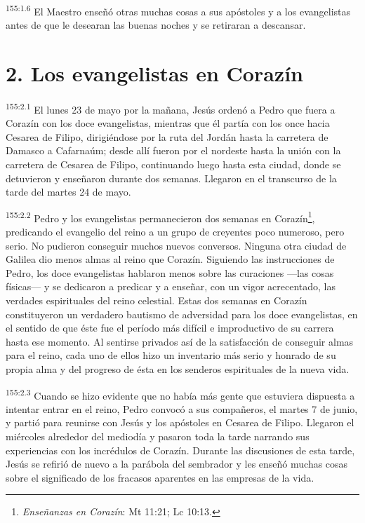 \par
\textsuperscript{155:1.6} El Maestro enseñó otras muchas cosas a sus apóstoles y a los evangelistas antes de que le desearan las buenas noches y se retiraran a descansar.

\section*{2. Los evangelistas en Corazín}
\par
\textsuperscript{155:2.1} El lunes 23 de mayo por la mañana, Jesús ordenó a Pedro que fuera a Corazín con los doce evangelistas, mientras que él partía con los once hacia Cesarea de Filipo, dirigiéndose por la ruta del Jordán hasta la carretera de Damasco a Cafarnaúm; desde allí fueron por el nordeste hasta la unión con la carretera de Cesarea de Filipo, continuando luego hasta esta ciudad, donde se detuvieron y enseñaron durante dos semanas. Llegaron en el transcurso de la tarde del martes 24 de mayo.

\par
\textsuperscript{155:2.2} Pedro y los evangelistas permanecieron dos semanas en Corazín\footnote{\textit{Enseñanzas en Corazín}: Mt 11:21; Lc 10:13.}, predicando el evangelio del reino a un grupo de creyentes poco numeroso, pero serio. No pudieron conseguir muchos nuevos conversos. Ninguna otra ciudad de Galilea dio menos almas al reino que Corazín. Siguiendo las instrucciones de Pedro, los doce evangelistas hablaron menos sobre las curaciones ---las cosas físicas--- y se dedicaron a predicar y a enseñar, con un vigor acrecentado, las verdades espirituales del reino celestial. Estas dos semanas en Corazín constituyeron un verdadero bautismo de adversidad para los doce evangelistas, en el sentido de que éste fue el período más difícil e improductivo de su carrera hasta ese momento. Al sentirse privados así de la satisfacción de conseguir almas para el reino, cada uno de ellos hizo un inventario más serio y honrado de su propia alma y del progreso de ésta en los senderos espirituales de la nueva vida.

\par
\textsuperscript{155:2.3} Cuando se hizo evidente que no había más gente que estuviera dispuesta a intentar entrar en el reino, Pedro convocó a sus compañeros, el martes 7 de junio, y partió para reunirse con Jesús y los apóstoles en Cesarea de Filipo. Llegaron el miércoles alrededor del mediodía y pasaron toda la tarde narrando sus experiencias con los incrédulos de Corazín. Durante las discusiones de esta tarde, Jesús se refirió de nuevo a la parábola del sembrador y les enseñó muchas cosas sobre el significado de los fracasos aparentes en las empresas de la vida.

